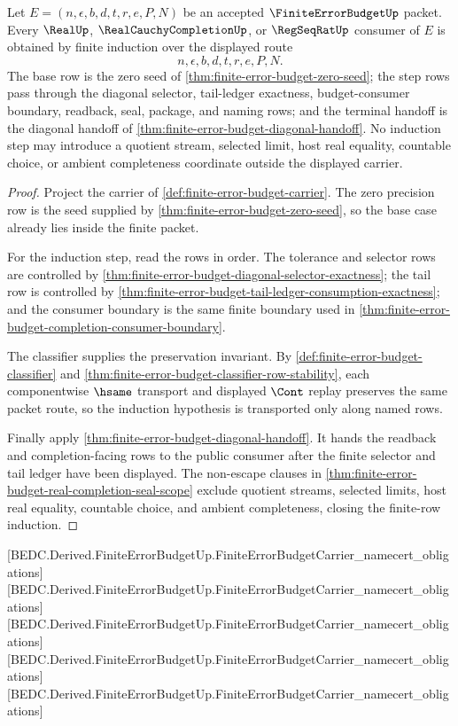 \begin{theorem}
\label{thm:finite-error-budget-finite-row-induction}
Let $E=(n,\epsilon,b,d,t,r,e,P,N)$ be an accepted
$\FiniteErrorBudgetUp$ packet. Every $\RealUp$,
$\RealCauchyCompletionUp$, or $\RegSeqRatUp$ consumer of $E$ is obtained by
finite induction over the displayed route
$$
n,\epsilon,b,d,t,r,e,P,N.
$$
The base row is the zero seed of
\autoref{thm:finite-error-budget-zero-seed}; the step rows pass through the
diagonal selector, tail-ledger exactness, budget-consumer boundary, readback,
seal, package, and naming rows; and the terminal handoff is the diagonal
handoff of \autoref{thm:finite-error-budget-diagonal-handoff}. No induction
step may introduce a quotient stream, selected limit, host real equality,
countable choice, or ambient completeness coordinate outside the displayed
carrier.
\end{theorem}
\begin{proof}
Project the carrier of \autoref{def:finite-error-budget-carrier}. The zero
precision row is the seed supplied by
\autoref{thm:finite-error-budget-zero-seed}, so the base case already lies
inside the finite packet.

For the induction step, read the rows in order. The tolerance and selector
rows are controlled by
\autoref{thm:finite-error-budget-diagonal-selector-exactness}; the tail row is
controlled by
\autoref{thm:finite-error-budget-tail-ledger-consumption-exactness}; and the
consumer boundary is the same finite boundary used in
\autoref{thm:finite-error-budget-completion-consumer-boundary}.

The classifier supplies the preservation invariant. By
\autoref{def:finite-error-budget-classifier} and
\autoref{thm:finite-error-budget-classifier-row-stability}, each componentwise
$\hsame$ transport and displayed $\Cont$ replay preserves the same packet
route, so the induction hypothesis is transported only along named rows.

Finally apply \autoref{thm:finite-error-budget-diagonal-handoff}. It hands the
readback and completion-facing rows to the public consumer after the finite
selector and tail ledger have been displayed. The non-escape clauses in
\autoref{thm:finite-error-budget-real-completion-seal-scope} exclude quotient
streams, selected limits, host real equality, countable choice, and ambient
completeness, closing the finite-row induction.
\end{proof}

[BEDC.Derived.FiniteErrorBudgetUp.FiniteErrorBudgetCarrier\_namecert\_obligations]
[BEDC.Derived.FiniteErrorBudgetUp.FiniteErrorBudgetCarrier\_namecert\_obligations]
[BEDC.Derived.FiniteErrorBudgetUp.FiniteErrorBudgetCarrier\_namecert\_obligations]
[BEDC.Derived.FiniteErrorBudgetUp.FiniteErrorBudgetCarrier\_namecert\_obligations]
[BEDC.Derived.FiniteErrorBudgetUp.FiniteErrorBudgetCarrier\_namecert\_obligations]


